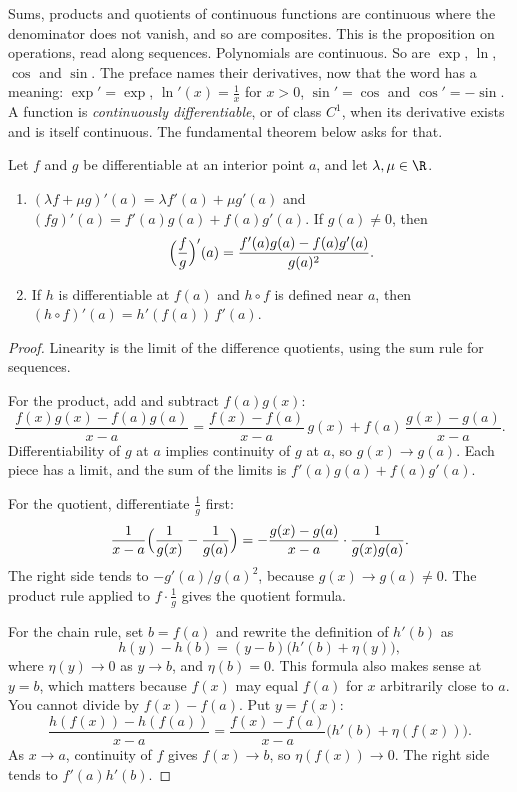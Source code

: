 Sums, products and quotients of continuous functions are continuous where the denominator does not vanish, and so are composites. This is the proposition on operations, read along sequences. Polynomials are continuous. So are $\exp$, $\ln$, $\cos$ and $\sin$. The preface names their derivatives, now that the word has a meaning: $\exp'=\exp$, $\ln'(x)=\frac1x$ for $x>0$, $\sin'=\cos$ and $\cos'=-\sin$. A function is \emph{continuously differentiable}, or of class $C^1$, when its derivative exists and is itself continuous. The fundamental theorem below asks for that.

\begin{proposition}\label{prop:early-differentiation}
Let $f$ and $g$ be differentiable at an interior point $a$, and let $\lambda,\mu\in\R$.
\begin{enumerate}[label=(\alph*)]
\item $(\lambda f+\mu g)'(a)=\lambda f'(a)+\mu g'(a)$ and $(fg)'(a)=f'(a)g(a)+f(a)g'(a)$. If $g(a)\ne0$, then
\[
\Bigl(\frac fg\Bigr)'(a)=\frac{f'(a)g(a)-f(a)g'(a)}{g(a)^2}.
\]
\item If $h$ is differentiable at $f(a)$ and $h\circ f$ is defined near $a$, then $(h\circ f)'(a)=h'(f(a))\,f'(a)$.
\end{enumerate}
\end{proposition}
\begin{proof}
Linearity is the limit of the difference quotients, using the sum rule for sequences.

For the product, add and subtract $f(a)g(x)$:
\[
\frac{f(x)g(x)-f(a)g(a)}{x-a}=\frac{f(x)-f(a)}{x-a}\,g(x)+f(a)\,\frac{g(x)-g(a)}{x-a}.
\]
Differentiability of $g$ at $a$ implies continuity of $g$ at $a$, so $g(x)\to g(a)$. Each piece has a limit, and the sum of the limits is $f'(a)g(a)+f(a)g'(a)$.

For the quotient, differentiate $\frac1g$ first:
\[
\frac1{x-a}\Bigl(\frac1{g(x)}-\frac1{g(a)}\Bigr)=-\frac{g(x)-g(a)}{x-a}\cdot\frac1{g(x)g(a)}.
\]
The right side tends to $-g'(a)/g(a)^2$, because $g(x)\to g(a)\ne0$. The product rule applied to $f\cdot\frac1g$ gives the quotient formula.

For the chain rule, set $b=f(a)$ and rewrite the definition of $h'(b)$ as
\[
h(y)-h(b)=(y-b)\bigl(h'(b)+\eta(y)\bigr),
\]
where $\eta(y)\to0$ as $y\to b$, and $\eta(b)=0$. This formula also makes sense at $y=b$, which matters because $f(x)$ may equal $f(a)$ for $x$ arbitrarily close to $a$. You cannot divide by $f(x)-f(a)$. Put $y=f(x)$:
\[
\frac{h(f(x))-h(f(a))}{x-a}=\frac{f(x)-f(a)}{x-a}\bigl(h'(b)+\eta(f(x))\bigr).
\]
As $x\to a$, continuity of $f$ gives $f(x)\to b$, so $\eta(f(x))\to0$. The right side tends to $f'(a)h'(b)$.
\end{proof}

